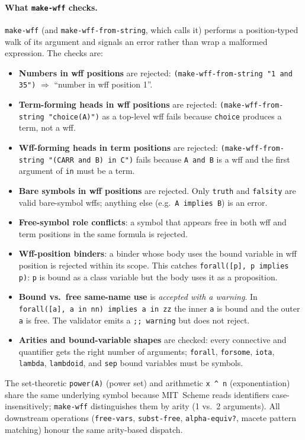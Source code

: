 \paragraph{What \texttt{make-wff} checks.}
\texttt{make-wff} (and \texttt{make-wff-from-string}, which calls it)
performs a position-typed walk of its argument and signals an error
rather than wrap a malformed expression.  The checks are:
\begin{sloppypar}
\begin{itemize}
\item \textbf{Numbers in wff positions} are rejected:
  \texttt{(make-wff-from-string "1 and 35")} $\Rightarrow$ ``number in wff
  position 1''.
\item \textbf{Term-forming heads in wff positions} are rejected:
  \texttt{(make-wff-from-string "choice(A)")} as a top-level wff fails because
  \texttt{choice} produces a term, not a wff.
\item \textbf{Wff-forming heads in term positions} are rejected:
  \texttt{(make-wff-from-string "(CARR and B) in C")} fails because \texttt{A and B}
  is a wff and the first argument of \texttt{in} must be a term.
\item \textbf{Bare symbols in wff positions} are rejected.  Only
  \texttt{truth} and \texttt{falsity} are valid bare-symbol wffs;
  anything else (e.g.\ \texttt{A implies B}) is an error.
\item \textbf{Free-symbol role conflicts}: a symbol that appears free
  in both wff and term positions in the same formula is rejected.
\item \textbf{Wff-position binders}: a binder whose body uses the
  bound variable in wff position is rejected within its scope.  This
  catches \texttt{forall([p], p implies p)}: \texttt{p} is bound as a
  class variable but the body uses it as a proposition.
\item \textbf{Bound vs.\ free same-name use} is \emph{accepted with a
  warning}.  In \texttt{forall([a], a in nn) implies a in zz} the
  inner \texttt{a} is bound and the outer \texttt{a} is free.  The
  validator emits a \texttt{;; warning} but does not reject.
\item \textbf{Arities and bound-variable shapes} are checked: every
  connective and quantifier gets the right number of arguments;
  \texttt{forall}, \texttt{forsome}, \texttt{iota},
  \texttt{lambda}, \texttt{lambdoid}, and \texttt{sep} bound variables must be
  symbols.
\end{itemize}
\end{sloppypar}
%
\begin{remark}\label{remark:27135-34761-138906}
%
The set-theoretic \texttt{power(A)} (power set) and arithmetic
\texttt{x \^{} n} (exponentiation) share the same underlying symbol because
MIT~Scheme reads identifiers case-insensitively; \texttt{make-wff}
distinguishes them by arity (1 vs.\ 2 arguments).  All downstream
operations (\texttt{free-vars}, \texttt{subst-free},
\texttt{alpha-equiv?}, macete pattern matching) honour the same
arity-based dispatch.

%
\end{remark}

